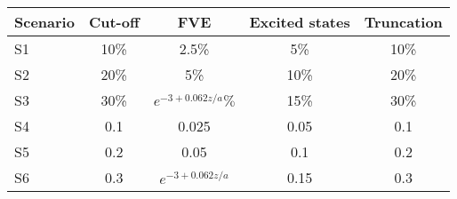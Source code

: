 \begin{tabularx}{0.8\textwidth}{Xcccc}
    \toprule
    Scenario & Cut-off & FVE & Excited states & Truncation\\
    \midrule
    S1 & 10\% & 2.5\% & 5\%  & 10\%\\
    S2 & 20\% & 5\%  & 10\%  & 20\%\\
    S3 & 30\% & $e^{-3+0.062z/a}\%$  & 15\%  & 30\% \\
    S4 & 0.1  & 0.025 & 0.05 & 0.1\\
    S5 & 0.2  & 0.05  & 0.1 & 0.2\\
    S6 & 0.3  & $e^{-3+0.062z/a}$ & 0.15 & 0.3\\
    \bottomrule
\end{tabularx}